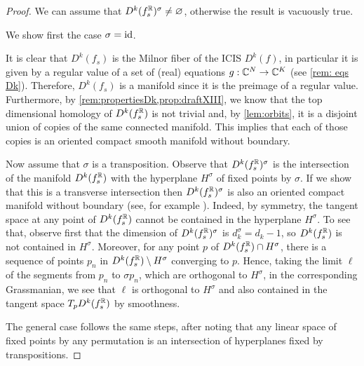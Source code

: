 \documentclass[a4paper,12pt]{amsart}
\begin{document}
\begin{proof} We can assume that $D^k(f_s^{\mathbb{R}})^\sigma\neq\varnothing$, otherwise the result is vacuously true.

We show first the case $\sigma=\operatorname{id}$. 

It is clear that $D^k(f_s)$ is the Milnor fiber of the ICIS $D^k(f)$, in particular it is given by a regular value of a set of (real) equations $g:\mathbb{C}^N\to\mathbb{C}^K$ (see \cref{rem: eqs Dk}).
Therefore, $D^k(f_s)$ is a manifold since it is the preimage of a regular value. Furthermore, by \cref{rem:propertiesDk,prop:draftXIII},
 we know that the top dimensional homology of $D^k(f_s^{\mathbb{R}})$ is not trivial and, by \cref{lem:orbits}, it is a disjoint union of copies of the same connected manifold. This implies that each of those copies is an oriented compact smooth manifold without boundary.
\newline

Now assume that $\sigma$ is a transposition. Observe that $D^k(f_s^{\mathbb{R}})^\sigma$ is the intersection of the manifold $D^k(f_s^{\mathbb{R}})$ with the hyperplane $H^\sigma$ of fixed points by $\sigma$. If we show that this is a transverse intersection then $D^k(f_s^{\mathbb{R}})^\sigma$ is also an oriented compact manifold without boundary (see, for example \cite[pp. 60 and 100]{Guillemin1974}). Indeed, by symmetry, the tangent space at any point of $D^k(f_s^{\mathbb{R}})$ cannot be contained in the hyperplane $H^\sigma$. To see that, observe first that the dimension of $D^k(f_s^{\mathbb{R}})^\sigma$ is $d_k^\sigma=d_k-1$, so $D^k(f_s^{\mathbb{R}})$ is not contained in $H^\sigma$. Moreover, for any point $p$ of $D^k(f_s^{\mathbb{R}})\cap H^\sigma$, there is a sequence of points $p_n$ in $D^k(f_s^{\mathbb{R}})\setminus H^\sigma$ converging to $p$. Hence, taking the limit $\ell$ of the segments from $p_n$ to $\sigma p_n$, which are orthogonal to $H^\sigma$, in the corresponding Grassmanian,  we see that $\ell$ is orthogonal to $H^\sigma$ and also contained in the tangent space $T_p D^k(f_s^{\mathbb{R}})$ by smoothness.
\newline

The general case follows the same steps, after noting that any linear space of fixed points by any permutation is an intersection of hyperplanes fixed by transpositions.
\end{proof}
\end{document}
